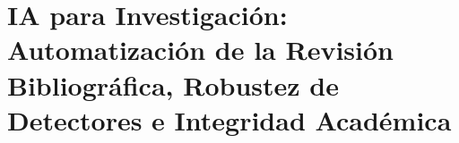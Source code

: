 
\providecommand{\text}[1]{\mbox{#1}}
\providecommand{\implies}{\Longrightarrow}

\section[IA para Investigación]{IA para Investigación: Automatización de la Revisión Bibliográfica, Robustez de Detectores e Integridad Académica}

